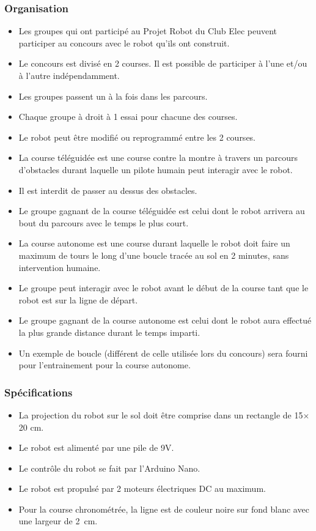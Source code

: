 \subsubsection*{Organisation}
\begin{itemize}
\item Les groupes qui ont participé au Projet Robot du Club Elec peuvent participer au concours avec le robot qu'ils ont construit.
\item Le concours est divisé en 2 courses. Il est possible de participer à l'une et/ou à l'autre indépendamment.
\item Les groupes passent un à la fois dans les parcours.
\item Chaque groupe à droit à 1 essai pour chacune des courses.
\item Le robot peut être modifié ou reprogrammé entre les 2 courses.
\item La course téléguidée est une course contre la montre à travers un parcours d'obstacles durant laquelle un pilote humain peut interagir avec le robot.
\item Il est interdit de passer au dessus des obstacles. 
\item Le groupe gagnant de la course téléguidée est celui dont le robot arrivera au bout du parcours avec le temps le plus court.
\item La course autonome est une course durant laquelle le robot doit faire un maximum de tours le long d'une boucle tracée au sol en 2 minutes, sans intervention humaine.
\item Le groupe peut interagir avec le robot avant le début de la course tant que le robot est sur la ligne de départ.
\item Le groupe gagnant de la course autonome est celui dont le robot aura effectué la plus grande distance durant le temps imparti.
\item Un exemple de boucle (différent de celle utilisée lors du concours) sera fourni pour l'entrainement pour la course autonome.
\end{itemize}

\subsubsection*{Spécifications}
\begin{itemize}
\item La projection du robot sur le sol doit être comprise dans un rectangle de 15$\times$20 cm.
\item Le robot est alimenté par une pile de 9V.
\item Le contrôle du robot se fait par l'Arduino Nano.
\item Le robot est propulsé par 2 moteurs électriques DC au maximum.
\item Pour la course chronométrée, la ligne est de couleur noire sur fond blanc avec une largeur de 2~cm.
\end{itemize}